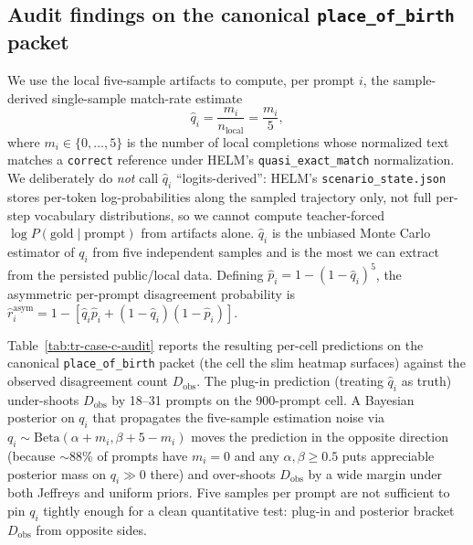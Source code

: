 \documentclass[11pt]{article}
\begin{document}
\subsection{Audit findings on the canonical \texttt{place\_of\_birth} packet}
\label{sec:tr-case-c-audit-findings}

We use the local five-sample artifacts to compute, per prompt $i$,
  the sample-derived single-sample match-rate estimate
\[
  \hat q_i = \frac{m_i}{n_{\text{local}}} = \frac{m_i}{5},
\]
where $m_i \in \{0, \dots, 5\}$ is the number of local completions
  whose normalized text matches a \texttt{correct} reference under
  HELM's \texttt{quasi\_exact\_match} normalization.
We deliberately do \emph{not} call $\hat q_i$ ``logits-derived'':
  HELM's \texttt{scenario\_state.json} stores per-token log-probabilities
  along the sampled trajectory only, not full per-step vocabulary
  distributions, so we cannot compute teacher-forced
  $\log P(\text{gold} \mid \text{prompt})$ from artifacts alone.
$\hat q_i$ is the unbiased Monte Carlo estimator of $q_i$ from five
  independent samples and is the most we can extract from the
  persisted public/local data.
Defining $\hat p_i = 1 - (1 - \hat q_i)^5$, the asymmetric per-prompt
  disagreement probability is $\hat r_i^{\text{asym}} = 1 - [\hat q_i
  \hat p_i + (1 - \hat q_i)(1 - \hat p_i)]$.

Table~\ref{tab:tr-case-c-audit} reports the resulting per-cell
  predictions on the canonical \texttt{place\_of\_birth} packet
  (the cell the slim heatmap surfaces) against the observed
  disagreement count $D_{\text{obs}}$.
The plug-in prediction (treating $\hat q_i$ as truth) under-shoots
  $D_{\text{obs}}$ by 18--31 prompts on the 900-prompt cell.
A Bayesian posterior on $q_i$ that propagates the five-sample
  estimation noise via $q_i \sim \text{Beta}(\alpha + m_i,
  \beta + 5 - m_i)$ moves the prediction in the opposite direction
  (because $\sim 88\%$ of prompts have $m_i = 0$ and any $\alpha,
  \beta \geq 0.5$ puts appreciable posterior mass on $q_i \gg 0$
  there) and over-shoots $D_{\text{obs}}$ by a wide margin under
  both Jeffreys and uniform priors.
Five samples per prompt are not sufficient to pin $q_i$ tightly
  enough for a clean quantitative test: plug-in and posterior
  bracket $D_{\text{obs}}$ from opposite sides.
\end{document}
